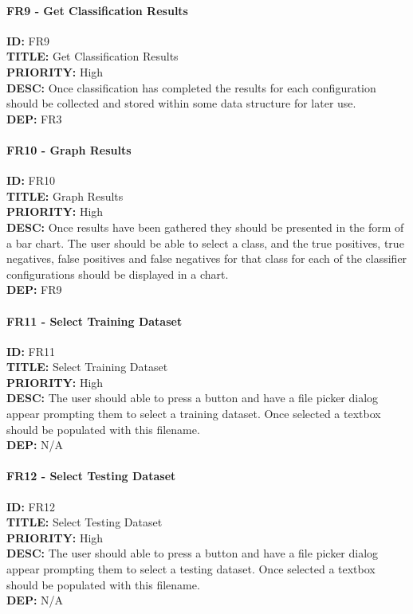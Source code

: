 \paragraph*{FR9 - Get Classification Results}
\textbf{ID:} FR9 \\
\textbf{TITLE:} Get Classification Results \\
\textbf{PRIORITY:} High \\
\textbf{DESC:}  Once classification has completed the results for each configuration should be collected and stored within some data structure for later use. \\
\textbf{DEP:} FR3
\paragraph*{FR10 - Graph Results}
\textbf{ID:} FR10 \\
\textbf{TITLE:} Graph Results \\
\textbf{PRIORITY:} High \\
\textbf{DESC:} Once results have been gathered they should be presented in the form of a bar chart. The user should be able to select a class, and the true positives, true negatives, false positives and false negatives for that class for each of the classifier configurations should be displayed in a chart.\\
\textbf{DEP:} FR9
\paragraph*{FR11 - Select Training Dataset}
\textbf{ID:} FR11 \\
\textbf{TITLE:} Select Training Dataset \\
\textbf{PRIORITY:} High \\
\textbf{DESC:} The user should able to press a button and have a file picker dialog appear prompting them to select a training dataset. Once selected a textbox should be populated with this filename.\\
\textbf{DEP:} N/A
\paragraph*{FR12 - Select Testing Dataset}
\textbf{ID:} FR12 \\
\textbf{TITLE:} Select Testing Dataset \\
\textbf{PRIORITY:} High \\
\textbf{DESC:}  The user should able to press a button and have a file picker dialog appear prompting them to select a testing dataset. Once selected a textbox should be populated with this filename. \\
\textbf{DEP:} N/A
